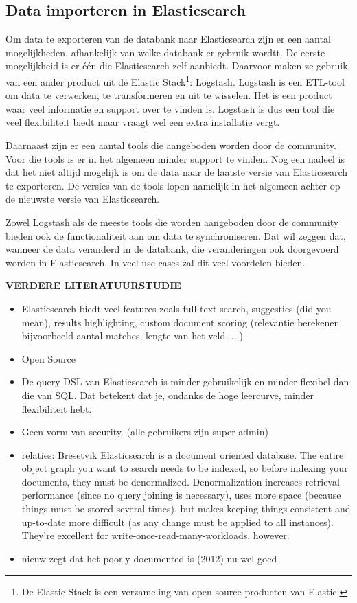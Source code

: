 \subsection{Data importeren in Elasticsearch}

Om data te exporteren van de databank naar Elasticsearch zijn er een aantal mogelijkheden, afhankelijk van welke databank er gebruik wordtt. De eerste mogelijkheid is er één die Elasticsearch zelf aanbiedt. Daarvoor maken ze gebruik van een ander product uit de Elastic Stack\footnote{De Elastic Stack is een verzameling van open-source producten van Elastic.}: Logstash. Logstash is een ETL-tool om data te verwerken, te transformeren en uit te wisselen. Het is een product waar veel informatie en support over te vinden is. Logstash is dus een tool die veel flexibiliteit biedt maar vraagt wel een extra installatie vergt. 

Daarnaast zijn er een aantal tools die aangeboden worden door de community. Voor die tools is er in het algemeen minder support te vinden. Nog een nadeel is dat het niet altijd mogelijk is om de data naar de laatste versie van Elasticsearch te exporteren. De versies van de tools lopen namelijk in het algemeen achter op de nieuwste versie van Elasticsearch. 

Zowel Logstash als de meeste tools die worden aangeboden door de community bieden ook de functionaliteit aan om data te synchroniseren. Dat wil zeggen dat, wanneer de data veranderd in de databank, die veranderingen ook doorgevoerd worden in Elasticsearch. In veel use cases zal dit veel voordelen bieden. 

\textbf{VERDERE LITERATUURSTUDIE}

\begin{itemize}
	\item Elasticsearch biedt veel features zoals full text-search, suggesties (did you mean), results highlighting, custom document scoring (relevantie berekenen bijvoorbeeld aantal matches, lengte van het veld, ...) 
	\item Open Source
	\item De query DSL van Elasticsearch is minder gebruikelijk en minder flexibel dan die van SQL. Dat betekent dat je, ondanks de hoge leercurve, minder flexibiliteit hebt.  
	\item Geen vorm van security. (alle gebruikers zijn super admin) 
	\item relaties: Bresetvik Elasticsearch is a document oriented database. The entire object graph you want to search needs to be indexed, so before indexing your documents, they must be denormalized. Denormalization increases retrieval performance (since no query joining is necessary), uses more space (because things must be stored several times), but makes keeping things consistent and up-to-date more difficult (as any change must be applied to all instances). They're excellent for write-once-read-many-workloads, however.
	\item nieuw zegt dat het poorly documented is (2012) nu wel goed
\end{itemize}




